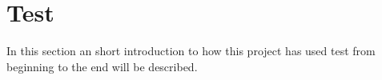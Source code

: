 
\section{Test}
In this section an short introduction to how this project has used test from beginning to the end will be described.


\FloatBarrier